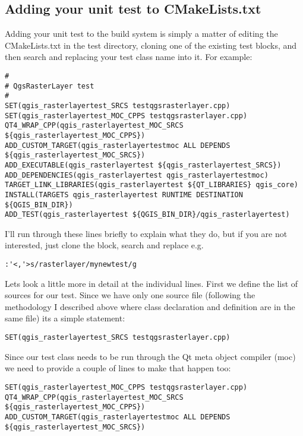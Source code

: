 \subsection{Adding your unit test to CMakeLists.txt}
Adding your unit test to the build system is simply a matter of editing 
the CMakeLists.txt in the test directory, cloning one of the existing 
test blocks, and then search and replacing your test class name into it. 
For example:

\begin{verbatim}
#
# QgsRasterLayer test
#
SET(qgis_rasterlayertest_SRCS testqgsrasterlayer.cpp)
SET(qgis_rasterlayertest_MOC_CPPS testqgsrasterlayer.cpp)
QT4_WRAP_CPP(qgis_rasterlayertest_MOC_SRCS ${qgis_rasterlayertest_MOC_CPPS})
ADD_CUSTOM_TARGET(qgis_rasterlayertestmoc ALL DEPENDS ${qgis_rasterlayertest_MOC_SRCS})
ADD_EXECUTABLE(qgis_rasterlayertest ${qgis_rasterlayertest_SRCS})
ADD_DEPENDENCIES(qgis_rasterlayertest qgis_rasterlayertestmoc)
TARGET_LINK_LIBRARIES(qgis_rasterlayertest ${QT_LIBRARIES} qgis_core)
INSTALL(TARGETS qgis_rasterlayertest RUNTIME DESTINATION ${QGIS_BIN_DIR})
ADD_TEST(qgis_rasterlayertest ${QGIS_BIN_DIR}/qgis_rasterlayertest)
\end{verbatim}

I'll run through these lines briefly to explain what they do, but if 
you are not interested, just clone the block, search and replace e.g.

\begin{verbatim}
:'<,'>s/rasterlayer/mynewtest/g
\end{verbatim}

Lets look a little more in detail at the individual lines. First we 
define the list of sources for our test. Since we have only one source file 
(following the methodology I described above where class declaration and 
definition are in the same file) its a simple statement:

\begin{verbatim}
SET(qgis_rasterlayertest_SRCS testqgsrasterlayer.cpp)
\end{verbatim}

Since our test class needs to be run through the Qt meta object compiler (moc) 
we need to provide a couple of lines to make that happen too:

\begin{verbatim}
SET(qgis_rasterlayertest_MOC_CPPS testqgsrasterlayer.cpp)
QT4_WRAP_CPP(qgis_rasterlayertest_MOC_SRCS ${qgis_rasterlayertest_MOC_CPPS})
ADD_CUSTOM_TARGET(qgis_rasterlayertestmoc ALL DEPENDS ${qgis_rasterlayertest_MOC_SRCS})
\end{verbatim}

